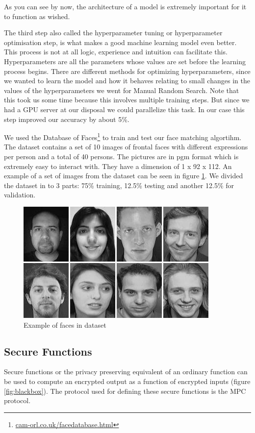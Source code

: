 As you can see by now, the architecture of a model is extremely important for it to function as wished.

The third step also called the hyperparameter tuning or hyperparameter optimisation step, is what makes a good machine learning model even better. This process is not at all logic, experience and intuition can facilitate this. Hyperparameters are all the parameters whose values are set before the learning process begins. There are different methods for optimizing hyperparameters, since we wanted to learn the model and how it behaves relating to small changes in the values of the hyperparameters we went for Manual Random Search. Note that this took us some time because this involves multiple training steps. But since we had a GPU server at our disposal we could parallelize this task. In our case this step improved our accuracy by about 5\%.

We used the Database of Faces\footnote{\url{cam-orl.co.uk/facedatabase.html}} to train and test our face matching algortihm. The dataset contains a set of 10 images of frontal faces with different expressions per person and a total of 40 persons. The pictures are in pgm format which is extremely easy to interact with. They have a dimension of 1 x 92 x 112. An example of a set of images from the dataset can be seen in figure \ref{fig:databaseoffaces}. We divided the dataset in to 3 parts: 75\% training, 12.5\% testing and another 12.5\% for validation.

\begin{figure}[H]
  \includegraphics[scale=0.7]{fig/databaseoffacess.png}
  \centering
  \caption{Example of faces in dataset}
  \label{fig:databaseoffaces}
\end{figure}

\subsection{Secure Functions}
\label{Secure Functions}
Secure functions or the privacy preserving equivalent of an ordinary function can be used to compute an encrypted output as a function of encrypted inputs (figure \ref{fig:blackbox}). The protocol used for defining these secure functions is the MPC protocol.

